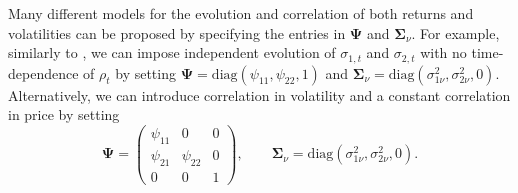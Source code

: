 Many different models for the evolution and correlation of both returns and volatilities can be proposed by specifying the entries in $\boldsymbol{\Psi}$ and $\boldsymbol{\Sigma}_{\nu}$. For example, similarly to \cite{bollerslev1990modelling}, we can impose independent evolution of $\sigma_{1,t}$ and $\sigma_{2,t}$ with no time-dependence of $\rho_t$ by setting $\boldsymbol{\Psi} = \mbox{diag}(\psi_{11}, \psi_{22}, 1)$ and $\boldsymbol{\Sigma}_{\nu} = \mbox{diag}( \sigma^2_{1\nu}, \sigma^2_{2\nu}, 0 )$. Alternatively, we can introduce correlation in volatility and a constant correlation in price \citep*{yu2006multivariate} by setting 
	\[ \boldsymbol{\Psi} = \left( \begin{array}{ccc} 
			\psi_{11} & 0 & 0 \\
			\psi_{21} & \psi_{22} & 0 \\
			0 & 0 & 1 
			\end{array} \right),  \qquad  \boldsymbol{\Sigma}_{\nu} = \mbox{diag}( \sigma^2_{1\nu}, \sigma^2_{2\nu}, 0 ). \]

